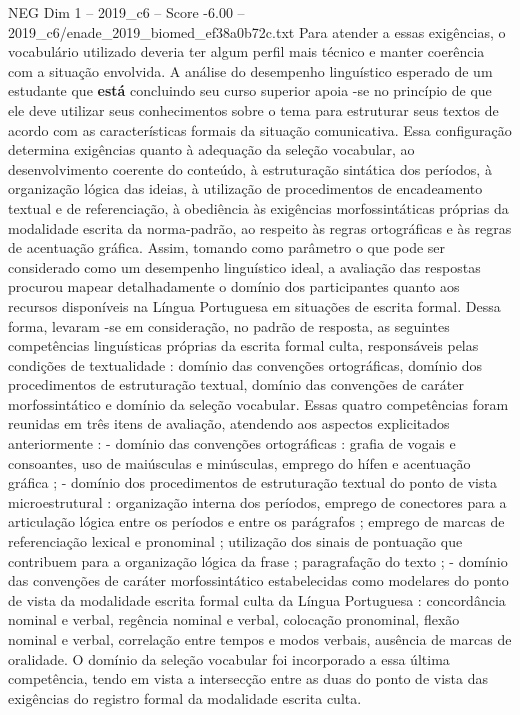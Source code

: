 \begin{textsample}{NEG Dim 1 – 2019\_c6 – Score -6.00 – 2019\_c6/enade\_2019\_biomed\_ef38a0b72c.txt}
Para atender a essas exigências, o vocabulário utilizado deveria ter algum perfil mais técnico e manter coerência com a situação envolvida.
A análise do desempenho linguístico esperado de um estudante que \textbf{está} concluindo seu curso superior apoia -se no princípio de que ele deve utilizar seus conhecimentos sobre o tema para estruturar seus textos de acordo com as características formais da situação comunicativa.
Essa configuração determina exigências quanto à adequação da seleção vocabular, ao desenvolvimento coerente do conteúdo, à estruturação sintática dos períodos, à organização lógica das ideias, à utilização de procedimentos de encadeamento textual e de referenciação, à obediência às exigências morfossintáticas próprias da modalidade escrita da norma-padrão, ao respeito às regras ortográficas e às regras de acentuação gráfica.
Assim, tomando como parâmetro o que pode ser considerado como um desempenho linguístico ideal, a avaliação das respostas procurou mapear detalhadamente o domínio dos participantes quanto aos recursos disponíveis na Língua Portuguesa em situações de escrita formal.
Dessa forma, levaram -se em consideração, no padrão de resposta, as seguintes competências linguísticas próprias da escrita formal culta, responsáveis pelas condições de textualidade : domínio das convenções ortográficas, domínio dos procedimentos de estruturação textual, domínio das convenções de caráter morfossintático e domínio da seleção vocabular.
Essas quatro competências foram reunidas em três itens de avaliação, atendendo aos aspectos explicitados anteriormente : - domínio das convenções ortográficas : grafia de vogais e consoantes, uso de maiúsculas e minúsculas, emprego do hífen e acentuação gráfica ; - domínio dos procedimentos de estruturação textual do ponto de vista microestrutural : organização interna dos períodos, emprego de conectores para a articulação lógica entre os períodos e entre os parágrafos ; emprego de marcas de referenciação lexical e pronominal ; utilização dos sinais de pontuação que contribuem para a organização lógica da frase ; paragrafação do texto ; - domínio das convenções de caráter morfossintático estabelecidas como modelares do ponto de vista da modalidade escrita formal culta da Língua Portuguesa : concordância nominal e verbal, regência nominal e verbal, colocação pronominal, flexão nominal e verbal, correlação entre tempos e modos verbais, ausência de marcas de oralidade.
O domínio da seleção vocabular foi incorporado a essa última competência, tendo em vista a intersecção entre as duas do ponto de vista das exigências do registro formal da modalidade escrita culta.

\end{textsample}
